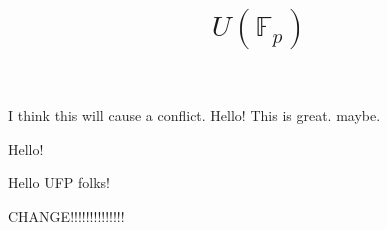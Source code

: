 \documentclass{amsart}
\begin{document}
I think this will cause a conflict. 
 Hello! This is great. maybe. 


    \title{$U(\mathbb{F}_p)$}



    \maketitle

 Hello!

 Hello UFP folks!

CHANGE!!!!!!!!!!!!!!
\end{document}
